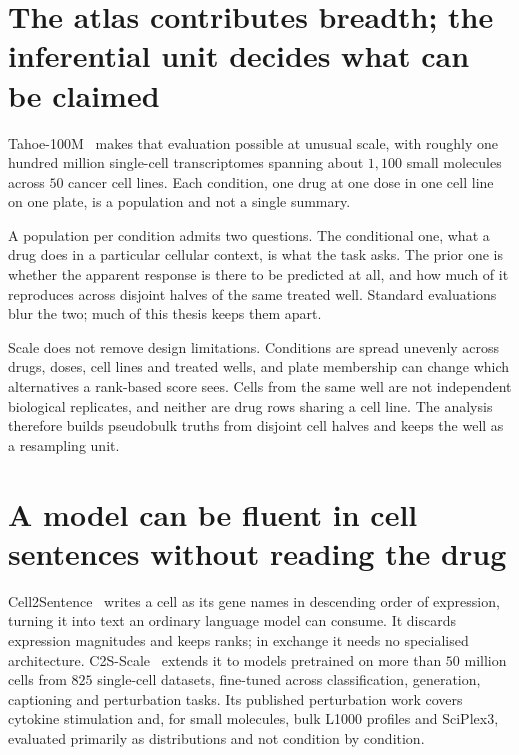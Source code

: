 \section{The atlas contributes breadth; the inferential unit decides what can be
claimed}
\label{sec:intro-atlas}

Tahoe-100M~\cite{tahoe100m} makes that evaluation possible at unusual scale,
with roughly one hundred million single-cell transcriptomes spanning about
$1{,}100$ small molecules across $50$ cancer cell lines. Each condition, one
drug at one dose in one cell line on one plate, is a population and not a
single summary.

A population per condition admits two questions. The conditional one, what a
drug does in a particular cellular context, is what the task asks. The prior one
is whether the apparent response is there to be predicted at all, and how much
of it reproduces across disjoint halves of the same treated well. Standard
evaluations blur the two; much of this thesis keeps them apart.

Scale does not remove design limitations. Conditions are spread unevenly across
drugs, doses, cell lines and treated wells, and plate membership can change
which alternatives a rank-based score sees. Cells from the same well are not
independent biological replicates, and neither are drug rows sharing a cell
line. The analysis therefore builds pseudobulk truths from disjoint cell halves
and keeps the well as a resampling unit.

\section{A model can be fluent in cell sentences without reading the drug}
\label{sec:intro-model}

Cell2Sentence~\cite{c2s} writes a cell as its gene names in descending order of
expression, turning it into text an ordinary language model can
consume. It discards expression
magnitudes and keeps ranks; in exchange it needs no specialised architecture.
C2S-Scale~\cite{c2sscale} extends it to models pretrained on more than $50$
million cells from $825$ single-cell datasets, fine-tuned across
classification, generation, captioning and perturbation tasks. Its published
perturbation work covers cytokine stimulation and, for small molecules, bulk
L1000 profiles and SciPlex3, evaluated primarily as distributions and not
condition by condition.

